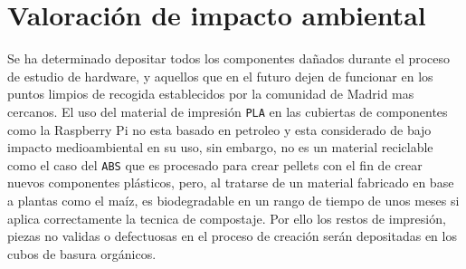 \section{Valoración de impacto ambiental}
\label{ch:Capitulo6.7}

Se ha determinado depositar todos los componentes dañados durante el proceso de estudio de hardware, y aquellos que en el futuro dejen de funcionar en los puntos limpios de recogida establecidos por la comunidad de Madrid mas cercanos. El uso del material de impresión \verb|PLA| en las cubiertas de componentes como la Raspberry Pi no esta basado en petroleo y esta considerado de bajo impacto medioambiental en su uso, sin embargo, no es un material reciclable como el caso del \verb|ABS| que es procesado para crear pellets con el fin de crear nuevos componentes plásticos, pero, al tratarse de un material fabricado en base a plantas como el maíz, es biodegradable en un rango de tiempo de unos meses si aplica correctamente la tecnica de compostaje. Por ello los restos de impresión, piezas no validas o defectuosas en el proceso de creación serán depositadas en los cubos de basura orgánicos.